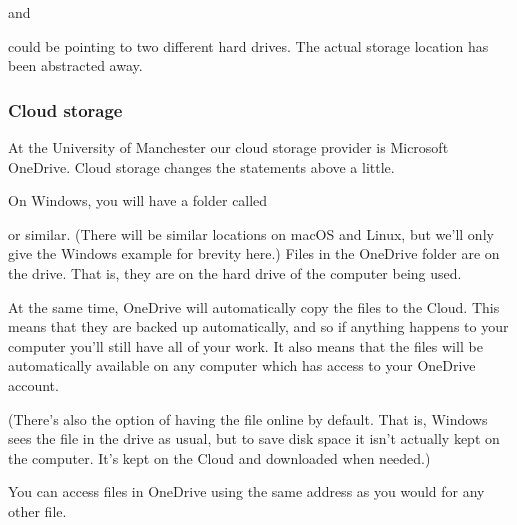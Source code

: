 \documentclass[letterpaper,10pt,british]{sphinxmanual}
\begin{document}
\sphinxAtStartPar
and

\begin{sphinxVerbatim}[commandchars=\\\{\}]
\end{sphinxVerbatim}

\sphinxAtStartPar
could be pointing to two different hard drives. The actual storage location has been abstracted away.


\subsubsection{Cloud storage}
\label{\detokenize{chapters/computer_software/files_and_folders:cloud-storage}}
\sphinxAtStartPar
At the University of Manchester our cloud storage provider is Microsoft OneDrive. Cloud storage changes the statements above a little.

\sphinxAtStartPar
On Windows, you will have a folder called

\begin{sphinxVerbatim}[commandchars=\\\{\}]
\end{sphinxVerbatim}

\sphinxAtStartPar
or similar. (There will be similar locations on macOS and Linux, but we’ll only give the Windows example for brevity here.) Files in the OneDrive folder are on the  drive. That is, they are on the hard drive of the computer being used.

\sphinxAtStartPar
At the same time, OneDrive will automatically copy the files to the Cloud. This means that they are backed up automatically, and so if anything happens to your computer you’ll still have all of your work. It also means that the files will be automatically available on any computer which has access to your OneDrive account.

\sphinxAtStartPar
(There’s also the option of having the file online by default. That is, Windows sees the file in the  drive as usual, but to save disk space it isn’t actually kept on the computer. It’s kept on the Cloud and downloaded when needed.)

\sphinxAtStartPar
You can access files in OneDrive using the same  address as you would for any other file.
\end{document}
